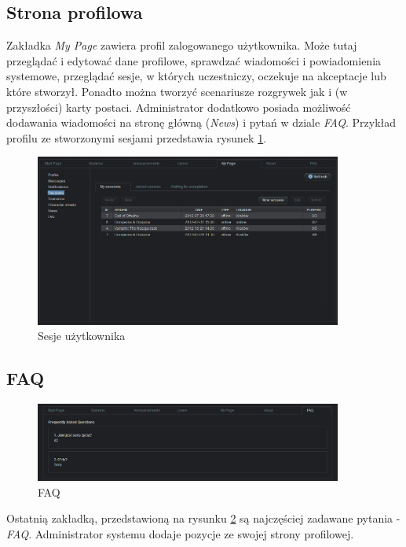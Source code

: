 \subsection{Strona profilowa}
\label{sec:my_page}
Zakładka \emph{My Page} zawiera profil zalogowanego użytkownika. Może tutaj przeglądać i edytować dane profilowe, sprawdzać wiadomości i powiadomienia systemowe, przeglądać sesje, w których uczestniczy, oczekuje na akceptacje lub które stworzył. Ponadto można tworzyć scenariusze rozgrywek jak i (w przyszłości) karty postaci. Administrator dodatkowo posiada możliwość dodawania wiadomości na stronę główną (\emph{News}) i pytań w dziale \emph{FAQ}. Przykład profilu ze stworzonymi sesjami przedstawia rysunek \ref{fig:mypage_sessions}.

\begin{figure}[h!]	
\centering
\includegraphics[width=0.9\textwidth]{./img/interfejsy/mypage_sessions}
\caption{Sesje użytkownika}
\label{fig:mypage_sessions}
\end{figure}

\subsection{FAQ}
\label{sec:faq}

\begin{figure}[h!]	
\centering
\includegraphics[width=0.9\textwidth]{./img/interfejsy/faq}
\caption{FAQ}
\label{fig:faq}

\end{figure}
Ostatnią zakładką, przedstawioną na rysunku \ref{fig:faq} są najczęściej zadawane pytania - \emph{FAQ}. Administrator systemu dodaje pozycje ze swojej strony profilowej.


